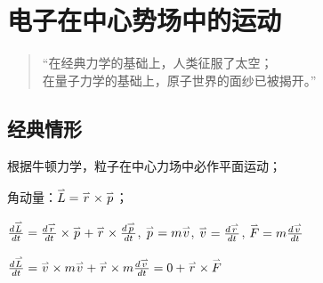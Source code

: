\section{电子在中心势场中的运动}

\begin{quotation}
``在经典力学的基础上，人类征服了太空；\\
在量子力学的基础上，原子世界的面纱已被揭开。''
\end{quotation}

\subsection{经典情形}

根据牛顿力学，粒子在中心力场中必作平面运动；


角动量：$\mathord{\buildrel{\lower3pt\hbox{$\scriptscriptstyle\rightharpoonup$}}
\over L}  = \mathord{\buildrel{\lower3pt\hbox{$\scriptscriptstyle\rightharpoonup$}}
\over r}  \times \mathord{\buildrel{\lower3pt\hbox{$\scriptscriptstyle\rightharpoonup$}}
\over p} $；

$\frac{{d\mathord{\buildrel{\lower3pt\hbox{$\scriptscriptstyle\rightharpoonup$}}
\over L} }}{{dt}} = \frac{{d\mathord{\buildrel{\lower3pt\hbox{$\scriptscriptstyle\rightharpoonup$}}
\over r} }}{{dt}} \times \mathord{\buildrel{\lower3pt\hbox{$\scriptscriptstyle\rightharpoonup$}}
\over p}  + \mathord{\buildrel{\lower3pt\hbox{$\scriptscriptstyle\rightharpoonup$}}
\over r}  \times \frac{{d\mathord{\buildrel{\lower3pt\hbox{$\scriptscriptstyle\rightharpoonup$}}
\over p} }}{{dt}}$,
$\mathord{\buildrel{\lower3pt\hbox{$\scriptscriptstyle\rightharpoonup$}}
\over p}  = m\mathord{\buildrel{\lower3pt\hbox{$\scriptscriptstyle\rightharpoonup$}}
\over v} $,
$\mathord{\buildrel{\lower3pt\hbox{$\scriptscriptstyle\rightharpoonup$}}
\over v}  = \frac{{d\mathord{\buildrel{\lower3pt\hbox{$\scriptscriptstyle\rightharpoonup$}}
\over r} }}{{dt}}$,
$\mathord{\buildrel{\lower3pt\hbox{$\scriptscriptstyle\rightharpoonup$}}
\over F}  = m\frac{{d\mathord{\buildrel{\lower3pt\hbox{$\scriptscriptstyle\rightharpoonup$}}
\over v} }}{{dt}}$


$\frac{{d\mathord{\buildrel{\lower3pt\hbox{$\scriptscriptstyle\rightharpoonup$}}
\over L} }}{{dt}} = \mathord{\buildrel{\lower3pt\hbox{$\scriptscriptstyle\rightharpoonup$}}
\over v}  \times m\mathord{\buildrel{\lower3pt\hbox{$\scriptscriptstyle\rightharpoonup$}}
\over v}  + \mathord{\buildrel{\lower3pt\hbox{$\scriptscriptstyle\rightharpoonup$}}
\over r}  \times m\frac{{d\mathord{\buildrel{\lower3pt\hbox{$\scriptscriptstyle\rightharpoonup$}}
\over v} }}{{dt}} = 0 + \mathord{\buildrel{\lower3pt\hbox{$\scriptscriptstyle\rightharpoonup$}}
\over r}  \times \mathord{\buildrel{\lower3pt\hbox{$\scriptscriptstyle\rightharpoonup$}}
\over F} $

